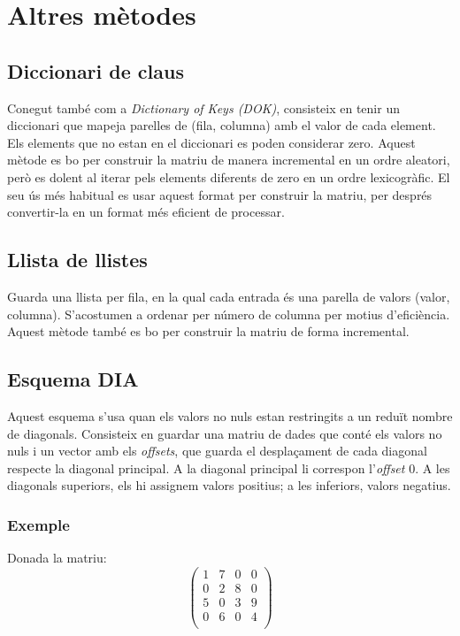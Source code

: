 \documentclass[11pt,a4paper,twoside]{report}
\begin{document}
	 \section{Altres mètodes}
	 
	 \subsection{Diccionari de claus}
	 
	 Conegut també com a \textit{Dictionary of Keys (DOK)}, consisteix en tenir un diccionari que mapeja parelles de (fila, columna) amb el valor de cada element. Els elements que no estan en el diccionari es poden considerar zero. 
	 Aquest mètode es bo per construir la matriu de manera incremental en un ordre aleatori, però es dolent al iterar pels elements diferents de zero en un ordre lexicogràfic. El seu ús més habitual es usar aquest format per construir la matriu, per després convertir-la en un format més eficient de processar.
	 
	 \subsection{Llista de llistes}
  
  Guarda una llista per fila, en la qual cada entrada és una parella de valors (valor, columna). S'acostumen a ordenar per número de columna per motius d'eficiència. Aquest mètode també es bo per construir la matriu de forma incremental.
  
  \subsection{Esquema DIA}
  
  Aquest esquema s'usa quan els valors no nuls estan restringits a un reduït nombre de diagonals. Consisteix en guardar una matriu de dades que conté els valors no nuls i un vector amb els \textit{offsets}, que guarda el desplaçament de cada diagonal respecte la diagonal principal.\newline
  A la diagonal principal li correspon l'\textit{offset} 0. A les diagonals superiors, els hi assignem valors positius; a les inferiors, valors negatius.
  
  \subsubsection*{Exemple}
	
	Donada la matriu:
	 \[
	 	\begin{pmatrix}
  		  	1	&	7	& 0	&	0	\\
  		  	0	&	2	&	8	&	0	\\
   		 	5	&	0	&	3	&	9	\\
    		0	&	6	&	0	&	4	\\
    \end{pmatrix} \]
    
\end{document}
